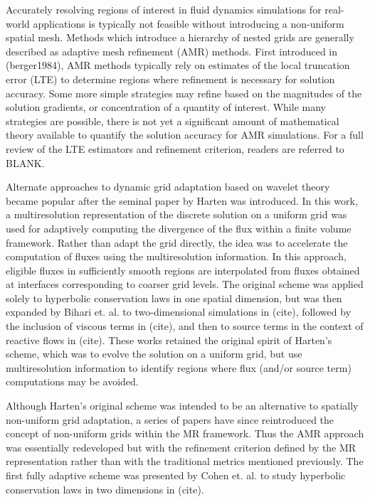 \documentclass[]{article}
\begin{document}
    Accurately resolving regions of interest in fluid dynamics simulations for
    real-world applications is typically not feasible without introducing a
    non-uniform spatial mesh. Methods which introduce a hierarchy of nested
    grids are generally described as adaptive mesh refinement (AMR) methods.
    First introduced in (berger1984), AMR methods typically rely on estimates
    of the local truncation error (LTE) to determine regions where refinement
    is necessary for solution accuracy. Some more simple strategies may refine
    based on the magnitudes of the solution gradients, or concentration of a
    quantity of interest. While many strategies are possible, there is not yet
    a significant amount of mathematical theory available to quantify the
    solution accuracy for AMR simulations. For a full review of the LTE
    estimators and refinement criterion, readers are referred to BLANK.

    Alternate approaches to dynamic grid adaptation based on wavelet theory
    became popular after the seminal paper by Harten \cite{harten1994} was
    introduced. In this work, a multiresolution representation of the discrete
    solution on a uniform grid was used for adaptively computing the divergence
    of the flux within a finite volume framework. Rather than adapt the grid
    directly, the idea was to accelerate the computation of fluxes using the
    multiresolution information. In this approach, eligible fluxes in
    sufficiently smooth regions are interpolated from fluxes obtained at
    interfaces corresponding to coarser grid levels. The original scheme was
    applied solely to hyperbolic conservation laws in one spatial dimension,
    but was then expanded by Bihari et. al. to two-dimensional simulations in (cite),
    followed by the inclusion of viscous terms in (cite), and then to source terms in
    the context of reactive flows in (cite). These works retained the
    original spirit of Harten's scheme, which was to evolve the solution on a
    uniform grid, but use multiresolution information to identify regions where
    flux (and/or source term) computations may be avoided.

    Although Harten's original scheme was intended to be an alternative to
    spatially non-uniform grid adaptation, a series of papers have since
    reintroduced the concept of non-uniform grids within the MR framework. Thus
    the AMR approach was essentially redeveloped but with the refinement
    criterion defined by the MR representation rather than with the traditional
    metrics mentioned previously. The first fully adaptive scheme was presented
    by Cohen et. al. to study hyperbolic conservation laws in two dimensions in
    (cite).
\end{document}

